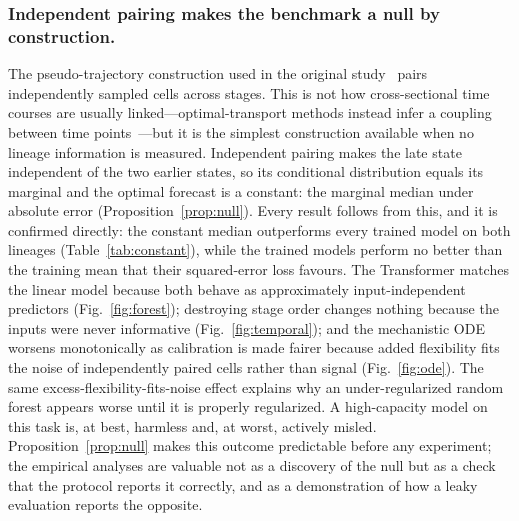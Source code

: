 \documentclass[pdflatex,sn-mathphys-num]{sn-jnl}
\theoremstyle{thmstyleone}%
\theoremstyle{thmstyletwo}%
\theoremstyle{thmstylethree}%
\begin{document}
\subsubsection{Independent pairing makes the benchmark a null by construction.} The pseudo-trajectory construction used in the original study~\cite{kanu2026transformer} pairs independently sampled cells across stages. This is not how cross-sectional time courses are usually linked---optimal-transport methods instead infer a coupling between time points~\cite{schiebinger2019optimal}---but it is the simplest construction available when no lineage information is measured. Independent pairing makes the late state independent of the two earlier states, so its conditional distribution equals its marginal and the optimal forecast is a constant: the marginal median under absolute error (Proposition~\ref{prop:null}). Every result follows from this, and it is confirmed directly: the constant median outperforms every trained model on both lineages (Table~\ref{tab:constant}), while the trained models perform no better than the training mean that their squared-error loss favours. The Transformer matches the linear model because both behave as approximately input-independent predictors (Fig.~\ref{fig:forest}); destroying stage order changes nothing because the inputs were never informative (Fig.~\ref{fig:temporal}); and the mechanistic ODE worsens monotonically as calibration is made fairer because added flexibility fits the noise of independently paired cells rather than signal (Fig.~\ref{fig:ode}). The same excess-flexibility-fits-noise effect explains why an under-regularized random forest appears worse until it is properly regularized. A high-capacity model on this task is, at best, harmless and, at worst, actively misled. Proposition~\ref{prop:null} makes this outcome predictable before any experiment; the empirical analyses are valuable not as a discovery of the null but as a check that the protocol reports it correctly, and as a demonstration of how a leaky evaluation reports the opposite.
\end{document}
